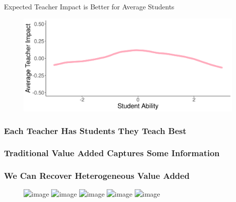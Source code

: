 \documentclass[t,aspectratio=169,11pt]{beamer}
\begin{document}

\begin{frame}{Expected Teacher Impact is Better for Average Students } 

\begin{figure}
    \centering
\includegraphics[width=.85\linewidth]{slides/CIERS_Figures/average_teacher_example_1.png}
\end{figure}
\end{frame}


\begin{frame}

\frametitle<1>{Each Teacher Has Students They Teach Best}
\frametitle<2>{Traditional Value Added Captures Some Information}
\frametitle<3->{We Can Recover Heterogeneous Value Added}
\vfill
\begin{figure}
    \centering
\includegraphics<1>[width=.85\linewidth]{slides/CIERS_Figures/teacher_example_just_truth_1.png}
\includegraphics<2>[width=.85\linewidth]{slides/CIERS_Figures/teacher_example_truth_standard_1.png}
\includegraphics<3>[width=.85\linewidth]{slides/CIERS_Figures/teacher_example_truth_bin_1.png}
\includegraphics<4>[width=.85\linewidth]{slides/CIERS_Figures/teacher_example_truth_np_1.png}
\includegraphics<5>[width=.85\linewidth]{slides/CIERS_Figures/teacher_example_1.png}
\end{figure}
\end{frame}



\end{document}
